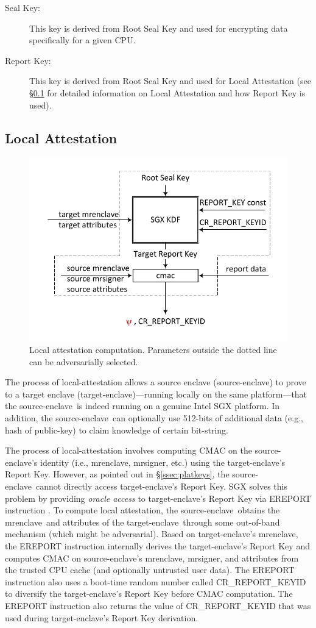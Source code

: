 \documentclass[10pt]{article}
\newcommand{\secref}[1]{\S\ref{#1}}
\newcommand{\mrenclave}{\textsf{mrenclave}}
\newcommand{\mrsigner}{\textsf{mrsigner}}
\newcommand{\se}{source-enclave}
\newcommand{\te}{target-enclave}
\begin{document}
\begin{description}
  \item[Seal Key:] This key is derived from Root Seal Key and used for
    encrypting data specifically for a given CPU.

  \item[Report Key:] This key is derived from Root Seal Key and used
    for Local Attestation (see \secref{ssec:localatt} for detailed
    information on Local Attestation and how Report Key is used).
  \end{description}

  \subsection{Local Attestation}
  \label{ssec:localatt}

  \begin{figure}
  \centering
  \includegraphics[width=0.5\linewidth]{Diagrams/LocalAttestation}
  \caption{Local attestation computation.
  Parameters outside the dotted line can be adversarially selected.}
  \label{fig:localattestation}
  \end{figure}

  The process of local-attestation allows a source enclave (\se) to
  prove to a target enclave (\te)---running locally on the same
  platform---that the \se\ is indeed running on a genuine Intel SGX
  platform. In addition, the \se\ can optionally use 512-bits of
  additional data (e.g., hash of public-key) to claim knowledge of
  certain bit-string.

  The process of local-attestation involves computing CMAC
  \cite{aescmac} on the \se's identity (i.e., \mrenclave, \mrsigner,
  etc.) using the \te's Report Key. However, as pointed out in
  \secref{ssec:platkeys}, the \se\ cannot directly access \te's Report
  Key. SGX solves this problem by providing \textit{oracle access} to
  \te's Report Key via \textsf{EREPORT} instruction
  \cite[\S14.4.1]{intelsdm}. To compute local attestation, the
  \se\ obtains the \mrenclave\ and attributes of the \te\ through some
  out-of-band mechanism (which might be adversarial). Based on \te's
  \mrenclave, the \textsf{EREPORT} instruction internally derives the
  \te's Report Key and computes \textsf{CMAC} on \se's \mrenclave,
  \mrsigner, and attributes from the trusted CPU cache (and optionally
  untrusted user data).  The \textsf{EREPORT} instruction also uses a
  boot-time random number called \textsf{CR\_REPORT\_KEYID} to
  diversify the \te's Report Key before \textsf{CMAC} computation. The
  \textsf{EREPORT} instruction also returns the value of
  \textsf{CR\_REPORT\_KEYID} that was used during \te's Report Key
  derivation.
\end{document}
